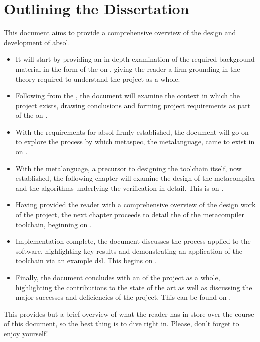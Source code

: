 \section{Outlining the Dissertation} %
\label{sec:outlining_the_dissertation}
This document aims to provide a comprehensive overview of the design and development of \gls{absol}. 
\begin{itemize}
    \item It will start by providing an in-depth examination of the required background material in the form of the  on , giving the reader a firm grounding in the theory required to understand the project as a whole.
    \item Following from the , the document will examine the context in which the project exists, drawing conclusions and forming project requirements as part of the  on .
    \item With the requirements for \gls{absol} firmly established, the document will go on to explore the process by which \gls{metaspec}, the metalanguage, came to exist in  on .
    \item With the metalanguage, a precursor to designing the toolchain itself, now established, the following chapter will examine the design of the metacompiler and the algorithms underlying the verification in detail.
    This is  on .
    \item Having provided the reader with a comprehensive overview of the design work of the project, the next chapter proceeds to detail the  of the metacompiler toolchain, beginning on .
    \item Implementation complete, the document discusses the  process applied to the software, highlighting key results and demonstrating an application of the toolchain via an example \gls{dsl}.
    This begins on .
    \item Finally, the document concludes with an  of the project as a whole, highlighting the contributions to the state of the art as well as discussing the major successes and deficiencies of the project. 
    This can be found on .
\end{itemize}

This provides but a brief overview of what the reader has in store over the course of this document, so the best thing is to dive right in.
Please, don't forget to enjoy yourself!


